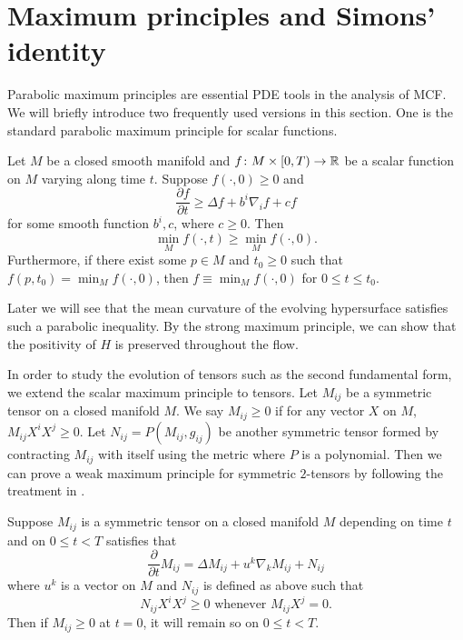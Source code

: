 \section{Maximum principles and Simons' identity}

Parabolic maximum principles are essential PDE tools in the analysis of MCF. We will briefly introduce two frequently used versions in this section. One is the standard parabolic maximum principle for scalar functions.

\begin{theorem} \label{thm:MPP}
	Let $M$ be a closed smooth manifold and \linebreak ${f\colon M \times [0,T) \to \mathbb{R}}$ be a scalar function on $M$ varying along time $t$. Suppose $f (\cdot,0) \geq 0$ and
	\[
		\frac{\partial f}{\partial t} \geq \Delta f + b^{i} \nabla_{i}^{} f+ cf
	\]
	for some smooth function $b^i,c$, where $c \geq 0.$ Then
	\[\min _M f (\cdot,t) \geq \min _M f (\cdot,0).\]
	Furthermore, if there exist some $p \in M$ and $t_0 \geq 0$ such that $f(p,t_0)=\min _M f (\cdot,0) $, then $f \equiv \min _M f (\cdot,0)$ for $0 \leq t \leq t_0.$
\end{theorem}
Later we will see that the mean curvature of the evolving hypersurface satisfies such a parabolic inequality. By the strong maximum principle, we can show that the positivity of $H$ is preserved throughout the flow.

In order to study the evolution of tensors such as the second fundamental form, we extend the scalar maximum principle to tensors. Let $M_{ij}$ be a symmetric tensor on a closed manifold $M$. We say $M_{ij }^{} \geq 0 $ if for any vector $X$ on $M$, $M_{ij }^{} X^i X^j \geq 0$. Let $N_{ij }^{} = P(M_{ij }^{} , g_{ij}^{} )$ be another symmetric tensor formed by contracting $M_{ij }^{} $ with itself using the metric where $P$ is a polynomial. Then we can prove a weak maximum principle for symmetric $2$-tensors by following the treatment in \cite[Theorem 4.6]{chow_ricci_2004}.

\begin{theorem} \label{thm:MP2T}
	Suppose $M_{ij }^{} $ is a symmetric tensor on a closed manifold $M$ depending on time $t$ and on $0 \leq t < T$ satisfies that \[\frac{\partial }{\partial t} M_{ij }^{} = \Delta M_{ij }^{} + u^k \nabla_{k}^{} M_{ij }^{} + N_{ij }^{} \] where $u^k$ is a vector on $M$ and $N_{ij }^{} $ is defined as above such that 
	\[
		N_{ij }^{} X^i X^j \geq 0 \text{   whenever  } M_{ij }^{} X^j =0.
	\]
	Then if $M_{ij }^{} \geq 0$ at $t=0$, it will remain so on $0 \leq t < T$.
\end{theorem}


